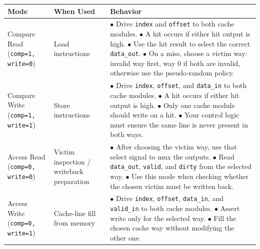 \documentclass[12pt]{article}
\begin{document}
\begin{center}
\begingroup
\small
\setlength{\tabcolsep}{5pt}
\renewcommand{\arraystretch}{1.06}
\begin{tabular}{|p{3.2cm}|p{3.2cm}|p{7.2cm}|}
\hline
\textbf{Mode} & \textbf{When Used} & \textbf{Behavior} \\
\hline
Compare Read \newline (\texttt{comp=1, write=0}) &
Load instructions &
\parbox[t]{\linewidth}{\raggedright
$\bullet$ Drive \texttt{index} and \texttt{offset} to both cache modules.\\
$\bullet$ A hit occurs if either hit output is high.\\
$\bullet$ Use the hit result to select the correct \texttt{data\_out}.\\
$\bullet$ On a miss, choose a victim way: invalid way first, way 0 if both are invalid, otherwise use the pseudo-random policy.\\[0.15em]} \\
\hline
Compare Write \newline (\texttt{comp=1, write=1}) &
Store instructions &
\parbox[t]{\linewidth}{\raggedright
$\bullet$ Drive \texttt{index}, \texttt{offset}, and \texttt{data\_in} to both cache modules.\\
$\bullet$ A hit occurs if either hit output is high.\\
$\bullet$ Only one cache module should write on a hit.\\
$\bullet$ Your control logic must ensure the same line is never present in both ways.\\[0.15em]} \\
\hline
Access Read \newline (\texttt{comp=0, write=0}) &
Victim inspection / writeback preparation &
\parbox[t]{\linewidth}{\raggedright
$\bullet$ After choosing the victim way, use that select signal to mux the outputs.\\
$\bullet$ Read \texttt{data\_out}, \texttt{valid}, and \texttt{dirty} from the selected way.\\
$\bullet$ Use this mode when checking whether the chosen victim must be written back.\\[0.15em]} \\
\hline
Access Write \newline (\texttt{comp=0, write=1}) &
Cache-line fill from memory &
\parbox[t]{\linewidth}{\raggedright
$\bullet$ Drive \texttt{index}, \texttt{offset}, \texttt{data\_in}, and \texttt{valid\_in} to both cache modules.\\
$\bullet$ Assert write only for the selected way.\\
$\bullet$ Fill the chosen cache way without modifying the other one.\\[0.15em]} \\
\hline
\end{tabular}
\endgroup
\end{center}
\end{document}
